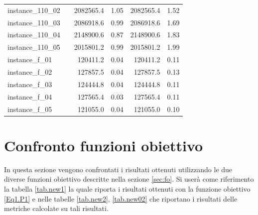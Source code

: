 \documentclass[12pt,a4paper,openright,twoside]{book}
\begin{document}
\begin{table}[h]
\begin{tabular}{|ll|rr|rr|}
instance\_110\_02            &     &  2082565.4  &      1.05  &    2082565.4  &     1.52  \\ 
instance\_110\_03            &     &  2086918.6  &      0.99  &    2086918.6  &     1.69  \\ 
instance\_110\_04            &     &  2148900.6  &      0.87  &    2148900.6  &     1.83  \\ 
instance\_110\_05            &     &  2015801.2  &      0.99  &    2015801.2  &     1.99  \\ 
instance\_f\_01            &     &   120411.2  &      0.04  &     120411.2  &     0.11  \\ 
instance\_f\_02            &     &   127857.5  &      0.04  &     127857.5  &     0.13  \\ 
instance\_f\_03            &     &   124444.8  &      0.04  &     124444.8  &     0.11  \\ 
instance\_f\_04            &     &   127565.4  &      0.03  &     127565.4  &     0.11  \\ 
instance\_f\_05            &     &   121055.0  &      0.04  &     121055.0  &     0.10  \\ 
\hline
\end{tabular}
\end{table}

\section{Confronto funzioni obiettivo}\label{confronto:fb}

In questa sezione vengono confrontati i risultati ottenuti utilizzando le due diverse funzioni obiettivo descritte nella sezione \ref{sec:fo}. Si userà come riferimento la tabella \ref{tab.new1} la quale riporta i risultati ottenuti con la funzione obiettivo \eqref{Eq1.P1} e nelle tabelle \ref{tab.new2}, \ref{tab.new02} che riportano i risultati delle metriche calcolate su tali risultati.
\end{document}
